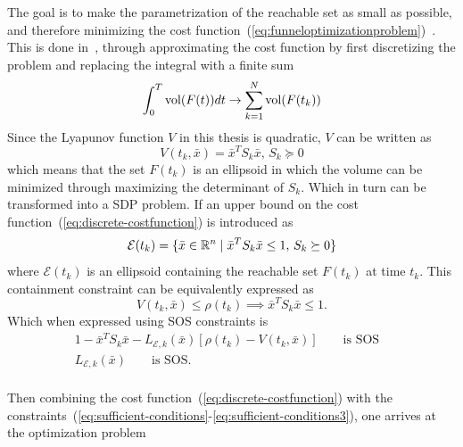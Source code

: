The goal is to make the parametrization of the reachable set as small as
possible, and therefore minimizing the cost
function~(\ref{eq:funneloptimizationproblem})~. This is done
in~\cite{majumdarFunnelLibrariesRealtime2017}, through approximating the cost
function by first discretizing the problem and replacing the integral with a
finite sum
\begin{equation}
  \int_{0}^{T} \operatorname{vol}(F(t)) dt \rightarrow \sum_{k=1}^{N} \operatorname{vol}(F(t_{k})) \label{eq:discrete-costfunction}
\end{equation}
Since the Lyapunov function \(V\) in this thesis is quadratic, \(V\) can be
written as
\begin{equation}
  V(t_{k}, \bar{x}) = {\bar{x}}^{T}S_{k}\bar{x}, \, S_{k} \succeq 0
\end{equation}
which means that the set \(F(t_{k})\) is an ellipsoid in which the volume can be
minimized through maximizing the determinant of \(S_{k}\). Which in turn can be
transformed into a \ac{SDP} problem. If an upper bound on the cost
function~(\ref{eq:discrete-costfunction}) is introduced as
\begin{equation}
  \mathcal{E} (t_{k}) = \lbrace\bar{x} \in \mathbb{R}^n \mid {\bar{x}}^{T}S_{k}\bar{x} \leq 1, \, S_{k} \succeq 0\rbrace
\end{equation}
where \( \mathcal{E} ( t_{k} ) \) is an ellipsoid containing the reachable set
\( F ( t_{k} ) \) at time \( t_{k} \). This containment constraint can be
equivalently expressed as
\begin{equation}
  V ( t_{k}, \bar{x} ) \leq \rho(t_{k})  \implies {\bar{x}}^{T}S_{k}\bar{x} \leq 1.
\end{equation}
Which when expressed using \ac{SOS} constraints is
\begin{align}
  1 - {\bar{x}}^{T}S_{k}\bar{x} - L_{\mathcal{E},k}(\bar{x})\left[ \rho(t_{k}) - V(t_{k}, \bar{x}) \right]  \qquad \text{is SOS}& \\
  L_{\mathcal{E},k}(\bar{x}) \qquad \text{is SOS.}& \\
\end{align}

Then combining the cost function~(\ref{eq:discrete-costfunction}) with the
constraints~(\ref{eq:sufficient-conditions}-\ref{eq:sufficient-conditions3}),
one arrives at the optimization problem

